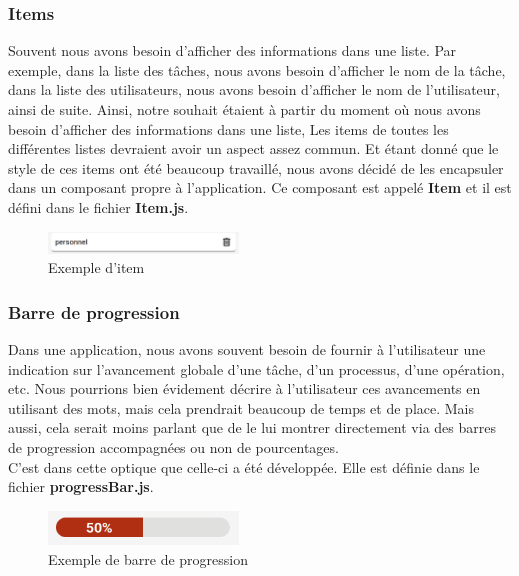 \documentclass[12pt]{article}
\begin{document}
        \subsubsection{Items}\label{subsubsec:items}
        Souvent nous avons besoin d'afficher des informations dans une liste. Par exemple, dans la liste des tâches, nous avons besoin
        d'afficher le nom de la tâche, dans la liste des utilisateurs, nous avons besoin d'afficher le nom de l'utilisateur, ainsi
        de suite. Ainsi, notre souhait étaient à partir du moment où nous avons besoin d'afficher des informations dans une liste,
        Les items de toutes les différentes listes devraient avoir un aspect assez commun. Et étant donné que le style de ces items
        ont été beaucoup travaillé, nous avons décidé de les encapsuler dans un composant propre à l'application. Ce composant est appelé
        \textbf{Item} et il est défini dans le fichier \textbf{Item.js}.\\
        \begin{figure}[H]
            \centering
            \includegraphics[width=0.45\textwidth]{images/item}
            \caption{Exemple d'item}
            \label{fig:item}
        \end{figure}


        \subsubsection{Barre de progression}\label{subsubsec:barre-de-progression}
        Dans une application, nous avons souvent besoin de fournir à l'utilisateur une indication sur l'avancement globale
        d'une tâche, d'un processus, d'une opération, etc. Nous pourrions bien évidement décrire à l'utilisateur ces
        avancements en utilisant des mots, mais cela prendrait beaucoup de temps et de place. Mais aussi, cela serait moins
        parlant que de le lui montrer directement via des barres de progression accompagnées ou non de pourcentages.\\
        C'est dans cette optique que celle-ci a été développée. Elle est définie dans le fichier \textbf{progressBar.js}.
        \begin{figure}[H]
            \centering
            \includegraphics[width=0.45\textwidth]{images/progress-bar}
            \caption{Exemple de barre de progression}
            \label{fig:progress-bar}
        \end{figure}
\end{document}
